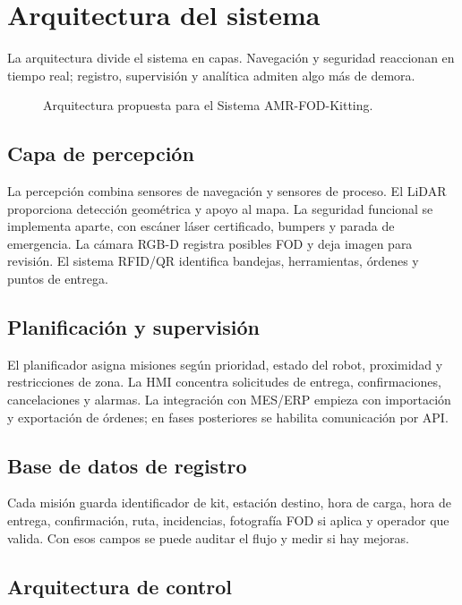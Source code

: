 \chapter{Arquitectura del sistema}

La arquitectura divide el sistema en capas. Navegación y seguridad reaccionan en tiempo real; registro, supervisión y analítica admiten algo más de demora.

\begin{figure}[H]
\centering
\resizebox{\textwidth}{!}{%

}
\caption{Arquitectura propuesta para el Sistema AMR-FOD-Kitting.}
\label{fig:arquitectura-amr}
\end{figure}

\section{Capa de percepción}

La percepción combina sensores de navegación y sensores de proceso. El LiDAR proporciona detección geométrica y apoyo al mapa. La seguridad funcional se implementa aparte, con escáner láser certificado, bumpers y parada de emergencia. La cámara RGB-D registra posibles FOD y deja imagen para revisión. El sistema RFID/QR identifica bandejas, herramientas, órdenes y puntos de entrega.

\section{Planificación y supervisión}

El planificador asigna misiones según prioridad, estado del robot, proximidad y restricciones de zona. La HMI concentra solicitudes de entrega, confirmaciones, cancelaciones y alarmas. La integración con MES/ERP empieza con importación y exportación de órdenes; en fases posteriores se habilita comunicación por API.

\section{Base de datos de registro}

Cada misión guarda identificador de kit, estación destino, hora de carga, hora de entrega, confirmación, ruta, incidencias, fotografía FOD si aplica y operador que valida. Con esos campos se puede auditar el flujo y medir si hay mejoras.

\section{Arquitectura de control}

